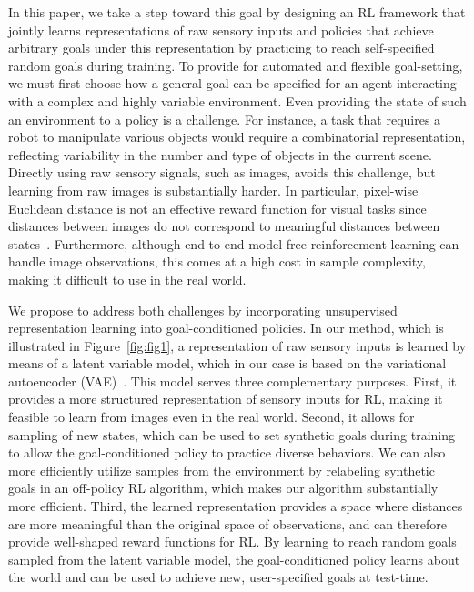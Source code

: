 In this paper, we take a step toward this goal by designing an RL framework that jointly learns representations of raw sensory inputs and policies that achieve arbitrary goals under this representation by practicing to reach self-specified random goals during training.
To provide for automated and flexible goal-setting, we must first choose how a general goal can be specified for an agent interacting with a complex and highly variable environment.
Even providing the state of such an environment to a policy is a challenge. For instance, a task that requires a robot to manipulate various objects would require a combinatorial representation, reflecting variability in the number and type of objects in the current scene.
Directly using raw sensory signals, such as images, avoids this challenge, but learning from raw images is substantially harder.
In particular, pixel-wise Euclidean distance is not an effective reward function for visual tasks since distances between images do not correspond to meaningful distances between states~\citep{ponomarenko2015image,zhang2018unreasonable}.
Furthermore, although end-to-end model-free reinforcement learning can handle image observations, this comes at a high cost in sample complexity, making it difficult to use in the real world.

We propose to address both challenges by incorporating unsupervised representation learning into goal-conditioned policies.
In our method, which is illustrated in Figure~\ref{fig:fig1}, a representation of raw sensory inputs is learned by means of a latent variable model, which in our case is based on the variational autoencoder (VAE)~\citep{kingma2014vae}.
This model serves three complementary purposes.
First, it provides a more structured representation of sensory inputs for RL, making it feasible to learn from images even in the real world.
Second, it allows for sampling of new states, which can be used to set synthetic goals during training to allow the goal-conditioned policy to practice diverse behaviors.
We can also more efficiently utilize samples from the environment by relabeling synthetic goals in an off-policy RL algorithm, which makes our algorithm substantially more efficient.
Third, the learned representation provides a space where distances are more meaningful than the original space of observations, and can therefore provide well-shaped reward functions for RL.
By learning to reach random goals sampled from the latent variable model, the goal-conditioned policy learns about the world and can be used to achieve new, user-specified goals at test-time.

